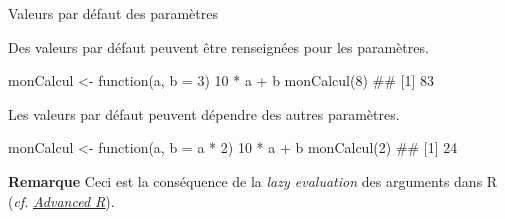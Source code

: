 \documentclass[12pt,handout,ignorenonframetext,]{beamer}
\newenvironment{Shaded}{}{}
\newcommand{\KeywordTok}[1]{\textcolor[rgb]{0.00,0.00,1.00}{{#1}}}
\newcommand{\DataTypeTok}[1]{{#1}}
\newcommand{\DecValTok}[1]{{#1}}
\newcommand{\StringTok}[1]{\textcolor[rgb]{0.00,0.50,0.50}{{#1}}}
\newcommand{\NormalTok}[1]{{#1}}
\renewenvironment{Shaded}{\begin{snugshade}}{\end{snugshade}}
\begin{document}
\begin{frame}[fragile]{Valeurs par défaut des paramètres}

Des valeurs par défaut peuvent être renseignées pour les paramètres.

\begin{Shaded}
\begin{Highlighting}[]
\NormalTok{monCalcul <-}\StringTok{ }\NormalTok{function(a, }\DataTypeTok{b =} \DecValTok{3}\NormalTok{) }\DecValTok{10} \NormalTok{*}\StringTok{ }\NormalTok{a +}\StringTok{ }\NormalTok{b}
\KeywordTok{monCalcul}\NormalTok{(}\DecValTok{8}\NormalTok{)}
  \NormalTok{## [1] 83}
\end{Highlighting}
\end{Shaded}

\pause Les valeurs par défaut peuvent dépendre des autres paramètres.

\begin{Shaded}
\begin{Highlighting}[]
\NormalTok{monCalcul <-}\StringTok{ }\NormalTok{function(a, }\DataTypeTok{b =} \NormalTok{a *}\StringTok{ }\DecValTok{2}\NormalTok{) }\DecValTok{10} \NormalTok{*}\StringTok{ }\NormalTok{a +}\StringTok{ }\NormalTok{b}
\KeywordTok{monCalcul}\NormalTok{(}\DecValTok{2}\NormalTok{)}
  \NormalTok{## [1] 24}
\end{Highlighting}
\end{Shaded}

\pause \textbf{Remarque} Ceci est la conséquence de la \emph{lazy
evaluation} des arguments dans R (\emph{cf.}
\href{http://adv-r.had.co.nz/Functions.html\#function-arguments}{\underline{\textit{Advanced R}}}).

\end{frame}
\end{document}
